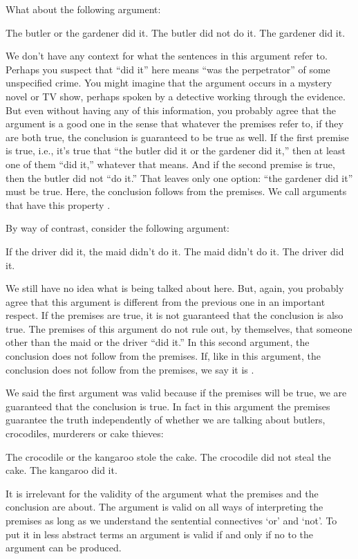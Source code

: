 What about the following argument:
\begin{earg}
	\prem The butler or the gardener did it.
	\prem The butler did not do it.
	\conc The gardener did it.
\end{earg}
We don't have any context for what the sentences in this argument refer to. Perhaps you suspect that ``did it'' here means ``was the perpetrator'' of some unspecified crime. You might imagine that the argument occurs in a mystery novel or TV show, perhaps spoken by a detective working through the evidence. But even without having any of this information, you probably agree that the argument is a good one in the sense that whatever the premises refer to, if they are both true, the conclusion is guaranteed to be true as well. If the first premise is true, i.e., it's true that ``the butler did it or the gardener did it,'' then at least one of them ``did it,'' whatever that means. And if the second premise is true, then the butler did not ``do it.'' That leaves only one option: ``the gardener did it'' must be true. Here, the conclusion follows from the premises. We call arguments that have this property .

By way of contrast, consider the following argument:
\begin{earg}\label{argMaidDriver}
	\prem If the driver did it, the maid didn't do it.
	\prem The maid didn't do it.
	\conc The driver did it.
\end{earg}
We still have no idea what is being talked about here. But, again, you probably agree that this argument is different from the previous one in an important respect. If the premises are true, it is not guaranteed that the conclusion is also true. The premises of this argument do not rule out, by themselves, that someone other than the maid or the driver ``did it.'' In this second argument, the conclusion does not follow from the premises. If, like in this argument, the conclusion does not follow from the premises, we say it is .

We said the first argument was valid because if the premises will be true, we are guaranteed  that the conclusion is true. In fact in this argument the premises guarantee the truth independently of whether we are talking about butlers, crocodiles, murderers or cake thieves:
\begin{earg}\label{argMaidDriver}
	\prem The crocodile or the kangaroo stole the cake.
	\prem The crocodile did not steal the cake.
	\conc The kangaroo did it.
\end{earg}
 It is irrelevant for the validity of the argument what the premises and the conclusion are about. The argument is valid on all ways of interpreting the premises as long as we understand the sentential connectives `or' and `not'. To put it in less abstract terms an argument is valid if and only if no  to the argument can be produced. 

